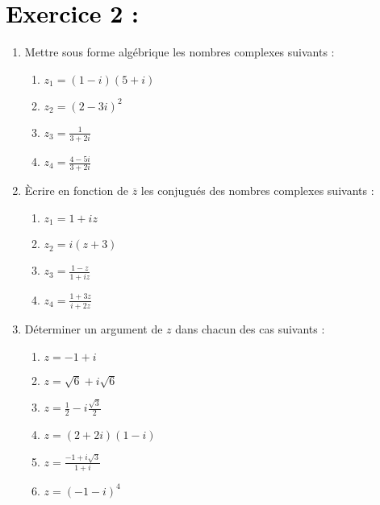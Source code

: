 \documentclass[12pt]{article}
\begin{document}
\section*{\textcolor{black}{Exercice 2 :}}
\begin{enumerate}
    \item Mettre sous forme alg\'ebrique les nombres complexes suivants :
    \begin{enumerate}
        \item $z_1 = (1 - i)(5 + i)$
        \item $z_2 = (2 - 3i)^2$
        \item $z_3 = \frac{1}{3 + 2i}$
        \item $z_4 = \frac{4 - 5i}{3 + 2i}$
    \end{enumerate}
    \item \`Ecrire en fonction de $\overline{z}$ les conjugu\'es des nombres complexes suivants :
    \begin{enumerate}
        \item $z_1 = 1 + iz$
        \item $z_2 = i(z + 3)$
        \item $z_3 = \frac{1 - z}{1 + iz}$
        \item $z_4 = \frac{1 + 3z}{i + 2z}$
    \end{enumerate}
    \item D\'eterminer un argument de $z$ dans chacun des cas suivants :
    \begin{enumerate}
        \item $z = -1 + i$
        \item $z = \sqrt{6} + i\sqrt{6}$
        \item $z = \frac{1}{2} - i\frac{\sqrt{3}}{2}$
        \item $z = (2 + 2i)(1 - i)$
        \item $z = \frac{-1 + i\sqrt{3}}{1 + i}$
        \item $z = (-1 - i)^4$
    \end{enumerate}
\end{enumerate}
\end{document}
